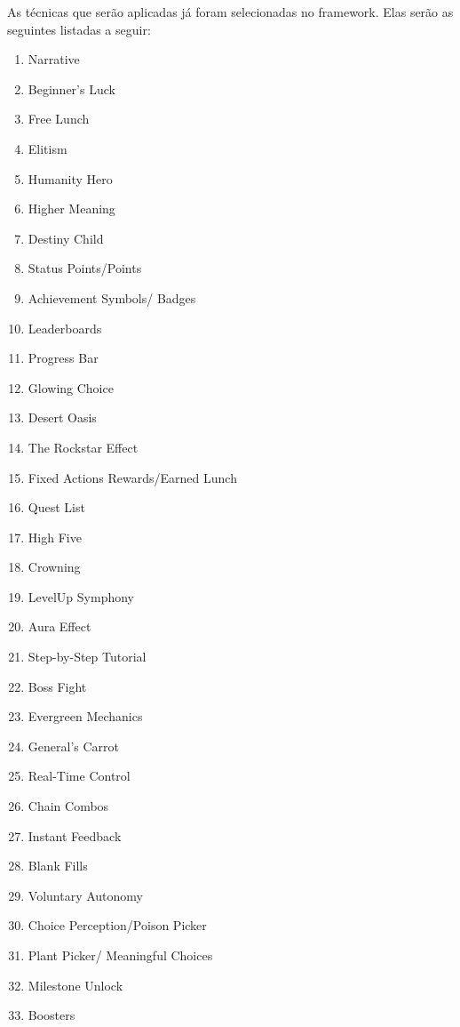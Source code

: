 As técnicas que serão aplicadas já foram selecionadas no framework. Elas serão as seguintes listadas a seguir:

\begin{multicols}{2}
    \begin{enumerate}
        \item Narrative
        \item Beginner's Luck
        \item Free Lunch
        \item Elitism
        \item Humanity Hero
        \item Higher Meaning
        \item Destiny Child
        \item Status Points/Points
        \item Achievement Symbols/ Badges
        \item Leaderboards
        \item Progress Bar
        \item Glowing Choice
        \item Desert Oasis
        \item The Rockstar Effect
        \item Fixed Actions Rewards/Earned Lunch
        \item Quest List
        \item High Five
        \item Crowning
        \item LevelUp Symphony
        \item Aura Effect
        \item Step-by-Step Tutorial
        \item Boss Fight
        \item Evergreen Mechanics
        \item General's Carrot
        \item Real-Time Control
        \item Chain Combos
        \item Instant Feedback
        \item Blank Fills
        \item Voluntary Autonomy
        \item Choice Perception/Poison Picker
        \item Plant Picker/ Meaningful Choices
        \item Milestone Unlock
        \item Boosters

\end{enumerate}
\end{multicols}

